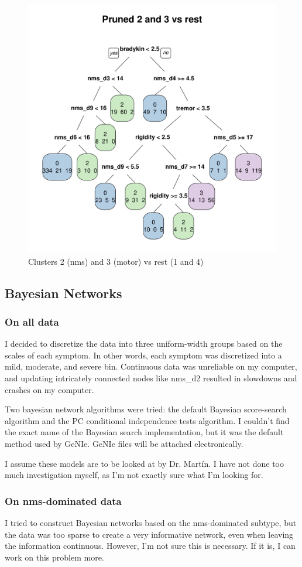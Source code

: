 \documentclass[10pt]{article}
\begin{document}
\begin{figure}[h]
  \centering
  \includegraphics[width=0.6\linewidth]{dtree-2and3va-pruned.pdf}
  \caption{Clusters 2 (nms) and 3 (motor) vs rest (1 and 4)}
  \label{fig:dtree-2and3va-pruned}
\end{figure}

\subsection{Bayesian Networks}

\subsubsection{On all data}

I decided to discretize the data into three uniform-width groups based on the
scales of each symptom. In other words, each symptom was discretized into a
mild, moderate, and severe bin. Continuous data was unreliable on my computer,
and updating intricately connected nodes like nms\_d2 resulted in slowdowns and
crashes on my computer.

Two bayesian network algorithms were tried: the default Bayesian score-search
algorithm and the PC conditional independence tests algorithm. I couldn't find
the exact name of the Bayesian search implementation, but it was the default
method used by GeNIe. GeNIe files will be attached electronically.

I assume these models are to be looked at by Dr. Mart\'in. I have not done too
much investigation myself, as I'm not exactly sure what I'm looking for.

\subsubsection{On nms-dominated data}
I tried to construct Bayesian networks based on the nms-dominated subtype, but
the data was too sparse to create a very informative network, even when leaving
the information continuous. However, I'm not sure this is necessary. If it is,
I can work on this problem more.
\end{document}
